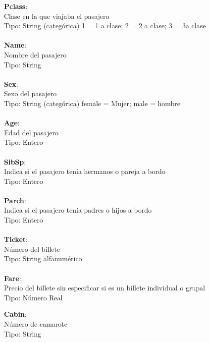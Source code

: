 \documentclass[
]{article}
\begin{document}
\textbf{Pclass}:\\
Clase en la que viajaba el pasajero\\
Tipo: String (categórica) 1 = 1 a clase; 2 = 2 a clase; 3 = 3a clase\\
\texttt{}~\\

\textbf{Name}:\\
Nombre del pasajero\\
Tipo: String\\
\texttt{}~\\

\textbf{Sex}:\\
Sexo del pasajero\\
Tipo: String (categórica) female = Mujer; male = hombre\\
\texttt{}~\\

\textbf{Age}:\\
Edad del pasajero\\
Tipo: Entero\\
\texttt{}~\\

\textbf{SibSp}:\\
Indica si el pasajero tenía hermanos o pareja a bordo\\
Tipo: Entero\\
\texttt{}~\\

\textbf{Parch}:\\
Indica si el pasajero tenía padres o hijos a bordo\\
Tipo: Entero\\
\texttt{}~\\

\textbf{Ticket}:\\
Número del billete\\
Tipo: String alfanumérico\\
\texttt{}~\\

\textbf{Fare}:\\
Precio del billete sin especificar si es un billete individual o
grupal\\
Tipo: Número Real\\
\texttt{}

\textbf{Cabin}:\\
Número de camarote\\
Tipo: String\\
\texttt{}~\\
\end{document}
